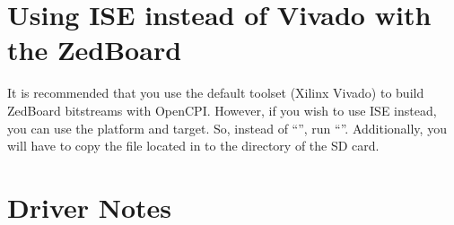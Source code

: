 \begin{appendices}
\section{Using ISE instead of Vivado with the ZedBoard}
It is recommended that you use the default toolset (Xilinx Vivado) to build ZedBoard bitstreams with OpenCPI. However, if you wish to use ISE instead, you can use the  platform and  target. So, instead of ``'', run ``''. Additionally, you will have to copy the  file located in  to the  directory of the SD card.
\section{Driver Notes}

%
\end{appendices}


